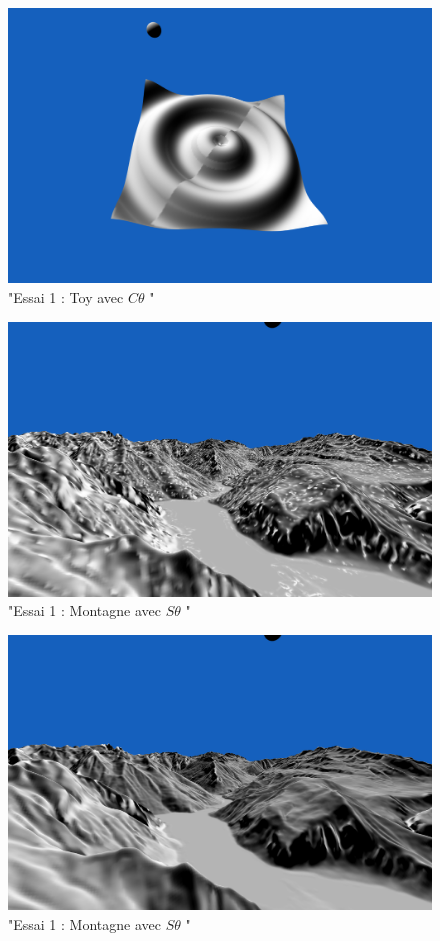 \documentclass[a4paper]{article}
\begin{document}
\begin{figure}[thb]
	\centering
    \includegraphics[scale=0.3]{Images/Essais/Essai_1_c_toy.png}
    \caption{"Essai 1 : Toy avec $C\theta$ "}
 \end{figure}


\begin{figure}[thb]
	\centering
    \includegraphics[scale=0.3]{Images/Essais/Essai_1_s_mount.png}
    \caption{"Essai 1 : Montagne avec $S\theta$ "}
 \end{figure}


\begin{figure}[thb]
	\centering
    \includegraphics[scale=0.3]{Images/Essais/Essai_1_c_mount.png}
    \caption{"Essai 1 : Montagne avec $S\theta$ "}
 \end{figure}
\end{document}

